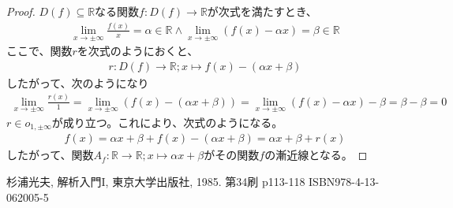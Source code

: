 \documentclass[dvipdfmx]{jsarticle}
\begin{document}
\begin{proof}
$D(f) \subseteq \mathbb{R}$なる関数$f:D(f) \rightarrow \mathbb{R}$が次式を満たすとき、
\begin{align*}
\lim_{x \rightarrow \pm \infty}\frac{f(x)}{x} = \alpha \in \mathbb{R} \land \lim_{x \rightarrow \pm \infty}\left( f(x) - \alpha x \right) = \beta \in \mathbb{R}
\end{align*}
ここで、関数$r$を次式のようにおくと、
\begin{align*}
r:D(f) \rightarrow \mathbb{R};x \mapsto f(x) - (\alpha x + \beta)
\end{align*}
したがって、次のようになり
\begin{align*}
\lim_{x \rightarrow \pm \infty}\frac{r(x)}{1} = \lim_{x \rightarrow \pm \infty}\left( f(x) - (\alpha x + \beta) \right) = \lim_{x \rightarrow \pm \infty}\left( f(x) - \alpha x \right) - \beta = \beta - \beta = 0
\end{align*}
$r \in o_{1, \pm \infty}$が成り立つ。これにより、次式のようになる。
\begin{align*}
f(x) = \alpha x + \beta + f(x) - (\alpha x + \beta) = \alpha x + \beta + r(x)
\end{align*}
したがって、関数$A_{f}:\mathbb{R} \rightarrow \mathbb{R};x \mapsto \alpha x + \beta$がその関数$f$の漸近線となる。
\end{proof}
\begin{thebibliography}{50}
  杉浦光夫, 解析入門I, 東京大学出版社, 1985. 第34刷 p113-118 ISBN978-4-13-062005-5
\end{thebibliography}
\end{document}

